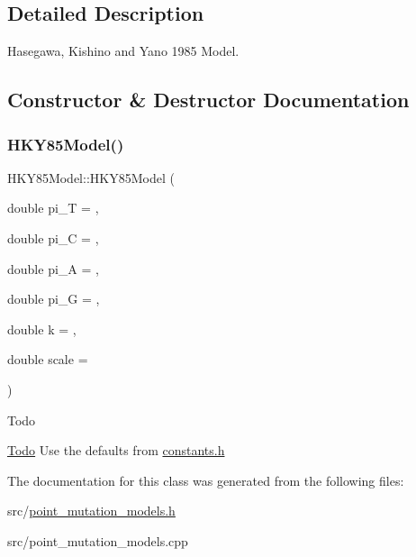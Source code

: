\subsection{Detailed Description}
Hasegawa, Kishino and Yano 1985 Model. 

\subsection{Constructor \& Destructor Documentation}
\mbox{\label{classrcombinator_1_1HKY85Model_aba3aea50215010285dd40b4093bf55c1}} 
\subsubsection{\texorpdfstring{H\+K\+Y85\+Model()}{HKY85Model()}}
{\footnotesize\ttfamily H\+K\+Y85\+Model\+::\+H\+K\+Y85\+Model (\begin{DoxyParamCaption}\item[{double}]{pi\+\_\+T = {},  }\item[{double}]{pi\+\_\+C = {},  }\item[{double}]{pi\+\_\+A = {},  }\item[{double}]{pi\+\_\+G = {},  }\item[{double}]{k = {},  }\item[{double}]{scale = {} }\end{DoxyParamCaption})}

\begin{DoxyRefDesc}{Todo}
\item[\mbox{\hyperlink{todo__todo000004}{Todo}}]Use the defaults from \mbox{\hyperlink{constants_8h}{constants.\+h}} \end{DoxyRefDesc}


The documentation for this class was generated from the following files\+:\begin{DoxyCompactItemize}
\item 
src/\mbox{\hyperlink{point__mutation__models_8h}{point\+\_\+mutation\+\_\+models.\+h}}\item 
src/point\+\_\+mutation\+\_\+models.\+cpp\end{DoxyCompactItemize}
